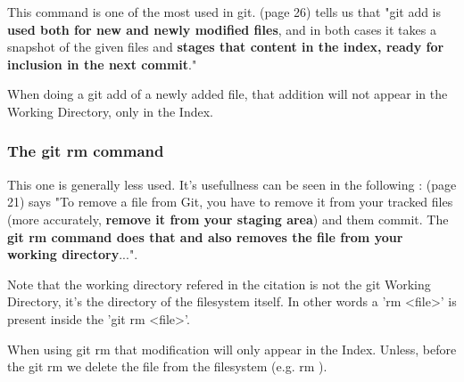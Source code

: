 This command is one of the most used in git. \cite{gitComm} (page 26)
tells us that
"git add is {\bf used both for new and newly modified files},
and in both cases it takes a snapshot of the given files
and {\bf stages that content in the index, ready for inclusion
in the next commit}." \par 
When doing a git add of a newly
added file, that
addition will not appear in the Working Directory, only in the
Index. 
\subsubsection{The git rm command}

This one is generally less used. It's usefullness can be
seen in the following : \cite{progit}
(page 21) says "To remove a file from Git, you have to remove it
from your tracked files (more accurately, {\bf remove it from your
staging area}) and them commit. The {\bf git rm command does that
and also removes the file from your working directory}...". \par
Note that the working directory refered in the citation is not
the git Working Directory, it's the directory of the filesystem itself.
In other words a 'rm <file>' is present inside the 'git rm <file>'. \par
When using git rm
that modification will only appear in the Index. Unless, before
the git rm we delete the file from the filesystem (e.g. rm ). \par

